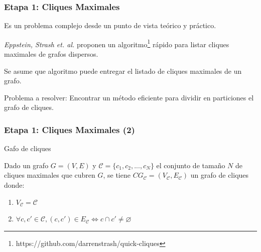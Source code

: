 \begin{frame}
\frametitle{Etapa 1: Cliques Maximales}
	

Es un problema complejo desde un punto de vista teórico y práctico. 

\textit{Eppstein, Strash et. al.} proponen un algoritmo\footnote{https://github.com/darrenstrash/quick-cliques} rápido para listar cliques maximales de grafos dispersos.

Se asume que algoritmo puede entregar el listado de cliques maximales de un grafo.

Problema a resolver: Encontrar un método eficiente para dividir en particiones el grafo de cliques.

\end{frame}


\begin{frame}
\frametitle{Etapa 1: Cliques Maximales (2)}

\begin{definition} 
	\label{def:cliqueGraph}
	Gafo de cliques
	
	Dado un grafo $G = (V, E)$ y $\mathcal{C} = \{c_{1}, c_{2}, ..., c_{N} \}$ el conjunto de tamaño $N$ de cliques maximales que cubren $G$, se tiene $CG_{\mathcal{C}} = (V_{\mathcal{C}}, E_{\mathcal{C}})$ un grafo de cliques donde:
	
	\begin{enumerate}
		\item $V_{\mathcal{C}} = \mathcal{C}$
		\item $\forall c, c' \in \mathcal{C}, (c, c') \in E_{\mathcal{C}} \Longleftrightarrow c \cap c' \neq \varnothing$
	\end{enumerate}
\end{definition}

\end{frame}


